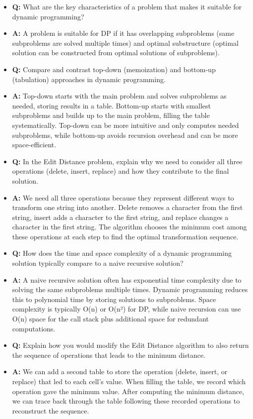 \documentclass[11pt,a4paper]{article}
\begin{document}
\begin{multicols}{2}
\begin{itemize}
    \item \textbf{Q:} What are the key characteristics of a problem that makes it suitable for dynamic programming?
    \item \textbf{A:} A problem is suitable for DP if it has overlapping subproblems (same subproblems are solved multiple times) and optimal substructure (optimal solution can be constructed from optimal solutions of subproblems).

    \item \textbf{Q:} Compare and contrast top-down (memoization) and bottom-up (tabulation) approaches in dynamic programming.
    \item \textbf{A:} Top-down starts with the main problem and solves subproblems as needed, storing results in a table. Bottom-up starts with smallest subproblems and builds up to the main problem, filling the table systematically. Top-down can be more intuitive and only computes needed subproblems, while bottom-up avoids recursion overhead and can be more space-efficient.

    \item \textbf{Q:} In the Edit Distance problem, explain why we need to consider all three operations (delete, insert, replace) and how they contribute to the final solution.
    \item \textbf{A:} We need all three operations because they represent different ways to transform one string into another. Delete removes a character from the first string, insert adds a character to the first string, and replace changes a character in the first string. The algorithm chooses the minimum cost among these operations at each step to find the optimal transformation sequence.

    \item \textbf{Q:} How does the time and space complexity of a dynamic programming solution typically compare to a naive recursive solution?
    \item \textbf{A:} A naive recursive solution often has exponential time complexity due to solving the same subproblems multiple times. Dynamic programming reduces this to polynomial time by storing solutions to subproblems. Space complexity is typically O(n) or O(n²) for DP, while naive recursion can use O(n) space for the call stack plus additional space for redundant computations.

    \item \textbf{Q:} Explain how you would modify the Edit Distance algorithm to also return the sequence of operations that leads to the minimum distance.
    \item \textbf{A:} We can add a second table to store the operation (delete, insert, or replace) that led to each cell's value. When filling the table, we record which operation gave the minimum value. After computing the minimum distance, we can trace back through the table following these recorded operations to reconstruct the sequence.


\end{itemize}
\end{multicols}
\end{document}
